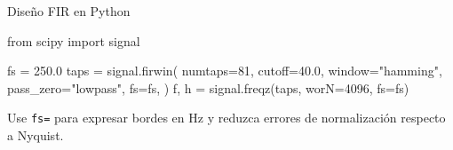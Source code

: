 \documentclass[
  ignorenonframetext,
  aspectratio=169,
  spanish,
  professionalfonts]{beamer}
\newenvironment{Shaded}{\begin{snugshade}}{\end{snugshade}}
\newcommand{\DecValTok}[1]{\textcolor[rgb]{0.68,0.00,0.00}{#1}}
\newcommand{\FloatTok}[1]{\textcolor[rgb]{0.68,0.00,0.00}{#1}}
\newcommand{\ImportTok}[1]{\textcolor[rgb]{0.00,0.46,0.62}{#1}}
\newcommand{\NormalTok}[1]{\textcolor[rgb]{0.00,0.23,0.31}{#1}}
\newcommand{\OperatorTok}[1]{\textcolor[rgb]{0.37,0.37,0.37}{#1}}
\newcommand{\StringTok}[1]{\textcolor[rgb]{0.13,0.47,0.30}{#1}}
\begin{document}
\begin{frame}[fragile]{Diseño FIR en Python}
\protect{}\label{diseuxf1o-fir-en-python}
\begin{Shaded}
\begin{Highlighting}[]
\ImportTok{from}\NormalTok{ scipy }\ImportTok{import}\NormalTok{ signal}

\NormalTok{fs }\OperatorTok{=} \FloatTok{250.0}
\NormalTok{taps }\OperatorTok{=}\NormalTok{ signal.firwin(}
\NormalTok{    numtaps}\OperatorTok{=}\DecValTok{81}\NormalTok{,}
\NormalTok{    cutoff}\OperatorTok{=}\FloatTok{40.0}\NormalTok{,}
\NormalTok{    window}\OperatorTok{=}\StringTok{"hamming"}\NormalTok{,}
\NormalTok{    pass\_zero}\OperatorTok{=}\StringTok{"lowpass"}\NormalTok{,}
\NormalTok{    fs}\OperatorTok{=}\NormalTok{fs,}
\NormalTok{)}
\NormalTok{f, h }\OperatorTok{=}\NormalTok{ signal.freqz(taps, worN}\OperatorTok{=}\DecValTok{4096}\NormalTok{, fs}\OperatorTok{=}\NormalTok{fs)}
\end{Highlighting}
\end{Shaded}

\begin{tcolorbox}[enhanced jigsaw, arc=.35mm, bottomrule=.15mm, bottomtitle=1mm, breakable, colback=white, colbacktitle=quarto-callout-tip-color!10!white, colframe=quarto-callout-tip-color-frame, coltitle=black, left=2mm, leftrule=.75mm, opacityback=0, opacitybacktitle=0.6, rightrule=.15mm, title={Buena práctica}, titlerule=0mm, toprule=.15mm, toptitle=1mm]

Use \texttt{fs=} para expresar bordes en Hz y reduzca errores de
normalización respecto a Nyquist.

\end{tcolorbox}
\end{frame}
\end{document}

